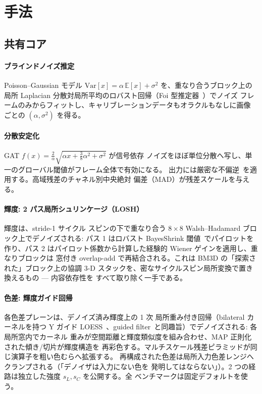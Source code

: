 \documentclass[journal]{IEEEtran}
\begin{document}
\section{手法}
\subsection{共有コア}
\paragraph{ブラインドノイズ推定} Poisson--Gaussian モデル
$\mathrm{Var}[x]=\alpha\,\mathbb{E}[x]+\sigma^2$ を、重なり合うブロック上の局所
Laplacian 分散対局所平均のロバスト回帰（Foi 型推定器~\cite{foi}）でノイズ
フレームのみからフィットし、キャリブレーションデータもオラクルもなしに画像
ごとの $(\alpha,\sigma^2)$ を得る。

\paragraph{分散安定化} GAT
$f(x)=\tfrac{2}{\alpha}\sqrt{\alpha x+\tfrac{3}{8}\alpha^2+\sigma^2}$ が信号依存
ノイズをほぼ単位分散へ写し、単一のグローバル閾値がフレーム全体で有効になる。
出力には厳密な不偏逆~\cite{makitalo}を適用する。高域残差のチャネル別中央絶対
偏差（MAD）が残差スケールを与える。

\paragraph{輝度: 2 パス局所シュリンケージ（LOSH）} 輝度は、stride-1 サイクル
スピンの下で重なり合う $8{\times}8$ Walsh--Hadamard ブロック上でデノイズされる:
パス 1 はロバスト BayesShrink 閾値~\cite{bayesshrink}でパイロットを作り、パス 2
はパイロット係数から計算した経験的 Wiener ゲインを適用し、重なりブロックは
窓付き overlap-add で再結合される。これは BM3D の「探索された」ブロック上の協調
3-D スタックを、密なサイクルスピン局所変換で置き換えるもの --- 内容依存性を
すべて取り除く一手である。

\paragraph{色差: 輝度ガイド回帰} 各色差プレーンは、デノイズ済み輝度上の 1 次
局所重み付き回帰（bilateral カーネルを持つ Y ガイド LOESS~\cite{loess}、guided
filter~\cite{guidedfilter,kopf}と同趣旨）でデノイズされる: 各局所窓内でカーネル
重みが空間距離と輝度類似度を組み合わせ、MAP 正則化された傾き/切片が輝度構造を
再彩色する。マルチスケール残差ピラミッドが同じ演算子を粗い色むらへ拡張する。
再構成された色差は局所入力色差レンジへクランプされる（「デノイザは入力にない色を
発明してはならない」）。2 つの経路は独立した強度 $s_L,s_C$ を公開する。全
ベンチマークは固定デフォルトを使う。
\end{document}
